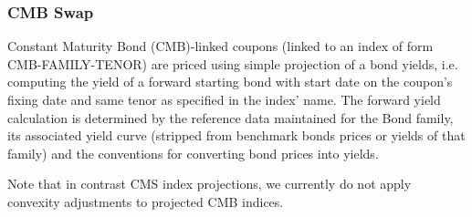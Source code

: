 \subsubsection{CMB Swap}
\label{pricing:ir_cmb}

Constant Maturity Bond (CMB)-linked coupons (linked to an index of form CMB-FAMILY-TENOR)
are priced using simple projection of a bond yields, i.e. computing the yield of a forward starting bond with
start date on the coupon's fixing date and same tenor as specified in the index' name.
The forward yield calculation is determined by the reference data maintained for the Bond family, its
associated yield curve (stripped from benchmark bonds prices or yields of that family) and the
conventions for converting bond prices into yields.

Note that in contrast CMS index projections, we currently do not apply convexity adjustments to projected CMB indices.
